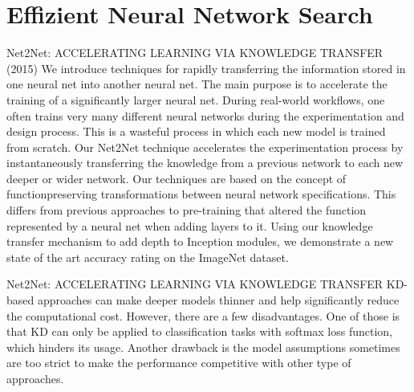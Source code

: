 \documentclass[10pt]{beamer}
\begin{document}
\section{Effizient Neural Network Search}

\begin{frame}{Net2Net: ACCELERATING LEARNING
VIA KNOWLEDGE TRANSFER (2015)}
 We introduce techniques for rapidly transferring the information stored in one neural net into another neural net. The main purpose is to accelerate the training of a significantly larger neural net. During real-world workflows, one often trains very many different neural networks during the experimentation and design process. This is a wasteful process in which each new model is trained from scratch. Our Net2Net technique accelerates the experimentation process by instantaneously transferring the knowledge from a previous network to each new deeper or wider network. Our techniques are based on the concept of functionpreserving transformations between neural network specifications. This differs from previous approaches to pre-training that altered the function represented by a neural net when adding layers to it. Using our knowledge transfer mechanism to add depth to Inception modules, we demonstrate a new state of the art accuracy rating on the ImageNet dataset.
\end{frame}

\begin{frame}{Net2Net: ACCELERATING LEARNING
VIA KNOWLEDGE TRANSFER}
KD-based approaches can make deeper models
thinner and help significantly reduce the computational cost.
However, there are a few disadvantages. One of those is that
KD can only be applied to classification tasks with softmax
loss function, which hinders its usage. Another drawback is
the model assumptions sometimes are too strict to make the
performance competitive with other type of approaches.
\end{frame}
\end{document}
